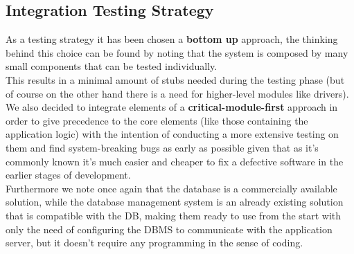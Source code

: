 \subsection{Integration Testing Strategy}
As a testing strategy it has been chosen a \textbf{bottom up} approach, the thinking behind this choice can be found by noting that the system is composed by many small components that can be tested individually.\\
This results in a minimal amount of stubs needed during the testing phase (but of course on the other hand there is a need for higher-level modules like drivers).\\
We also decided to integrate elements of a \textbf{critical-module-first} approach in order to give precedence to the core elements (like those containing the application logic) with the intention of conducting a more extensive testing on them and find system-breaking bugs as early as possible given that as it's commonly known it's much easier and cheaper to fix a defective software in the earlier stages of development.\\
Furthermore we note once again that the database is a commercially available solution, while the database management system is an already existing solution that is compatible with the DB, making them ready to use from the start with only the need of configuring the DBMS to communicate with the application server, but it doesn't require any programming in the sense of coding.








